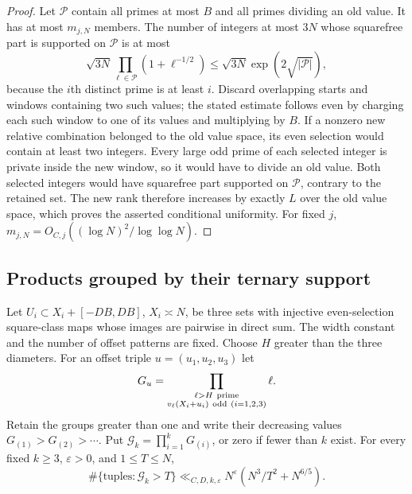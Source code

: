 \begin{proof}
Let $\mathcal P$ contain all primes at most $B$ and all primes dividing
an old value.  It has at most $m_{j,N}$ members.
The number of integers at most $3N$ whose squarefree part is supported
on $\mathcal P$ is at most
\[
 \sqrt{3N}\prod_{\ell\in\mathcal P}(1+\ell^{-1/2})
 \leq\sqrt{3N}\exp(2\sqrt{|\mathcal P|}),
\]
because the $i$th distinct prime is at least $i$.
Discard overlapping starts and windows containing two such values;
the stated estimate follows even by charging each such window to one
of its values and multiplying by $B$.
If a nonzero new relative combination belonged to the old value space,
its even selection would contain at least two integers.  Every large
odd prime of each selected integer is private inside the new window,
so it would have to divide an old value.  Both selected integers would
have squarefree part supported on $\mathcal P$, contrary to the retained
set.  The new rank therefore increases by exactly $L$ over the old
value space, which proves the asserted conditional uniformity.
For fixed $j$, $m_{j,N}=O_{C,j}((\log N)^2/\log\log N)$.
\end{proof}

\subsection{Products grouped by their ternary support}

\begin{proposition}\label{p1:arith:ternary-budget}
Let $U_i\subset X_i+[-DB,DB]$, $X_i\asymp N$, be three sets with
injective even-selection square-class maps whose images are pairwise
in direct sum.  The width constant and the number of offset patterns
are fixed.  Choose $H$ greater than the three diameters.  For an offset
triple $u=(u_1,u_2,u_3)$ let
\[
 G_u=\prod_{\substack{\ell>H\ {\rm prime}\\
       v_\ell(X_i+u_i)\ {\rm odd}\ (i=1,2,3)}}\ell.
\]
Retain the groups greater than one and write their decreasing values
$G_{(1)}>G_{(2)}>\cdots$.  Put
$\mathcal G_k=\prod_{i=1}^kG_{(i)}$, or zero if fewer than $k$ exist.
For every fixed $k\geq3$, $\varepsilon>0$, and $1\leq T\leq N$,
\begin{equation}\label{p1:arith:ternarycount}
 \#\{\text{tuples}:\mathcal G_k>T\}
 \ll_{C,D,k,\varepsilon}N^\varepsilon
      (N^3/T^2+N^{6/5}).
\end{equation}
\end{proposition}

